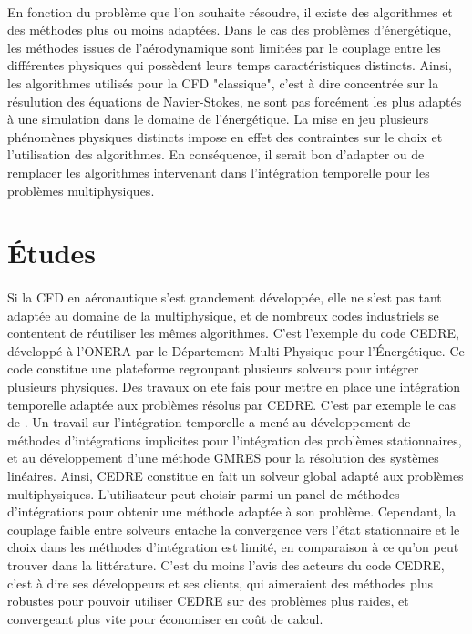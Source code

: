     \paragraph{}
    En fonction du problème que l'on souhaite résoudre, il existe des algorithmes et des méthodes plus ou moins adaptées.
    Dans le cas des problèmes d'énergétique, les méthodes issues de l'aérodynamique sont limitées par le couplage entre les différentes physiques qui possèdent leurs temps caractéristiques distincts.
    Ainsi, les algorithmes utilisés pour la CFD "classique", c'est à dire concentrée sur la résulution des équations de Navier-Stokes, ne sont pas forcément les plus adaptés à une simulation dans le domaine de l'énergétique.
    La mise en jeu plusieurs phénomènes physiques distincts impose en effet des contraintes sur le choix et l'utilisation des algorithmes.
    En conséquence, il serait bon d'adapter ou de remplacer les algorithmes intervenant dans l'intégration temporelle pour les problèmes multiphysiques.


  \section*{Études}

    \paragraph{}
    Si la CFD en aéronautique s'est grandement développée, elle ne s'est pas tant adaptée au domaine de la multiphysique, et de nombreux codes industriels se contentent de réutiliser les mêmes algorithmes.
    C'est l'exemple du code CEDRE, développé à l'ONERA par le Département Multi-Physique pour l'Énergétique.
    Ce code constitue une plateforme regroupant plusieurs solveurs pour intégrer plusieurs physiques.
    Des travaux on ete fais pour mettre en place une intégration temporelle adaptée aux problèmes résolus par CEDRE.
    C'est par exemple le cas de \cite{Selva1998}.
    Un travail sur l'intégration temporelle a mené au développement de méthodes d'intégrations implicites pour l'intégration des problèmes stationnaires, et au développement d'une méthode GMRES pour la résolution des systèmes linéaires.
    Ainsi, CEDRE constitue en fait un solveur global adapté aux problèmes multiphysiques.
    L'utilisateur peut choisir parmi un panel de méthodes d'intégrations pour obtenir une méthode adaptée à son problème.
    Cependant, la couplage faible entre solveurs entache la convergence vers l'état stationnaire et le choix dans les méthodes d'intégration est limité, en comparaison à ce qu'on peut trouver dans la littérature.
    C'est du moins l'avis des acteurs du code CEDRE, c'est à dire ses développeurs et ses clients, qui aimeraient des méthodes plus robustes pour pouvoir utiliser CEDRE sur des problèmes plus raides, et convergeant plus vite pour économiser en coût de calcul.

